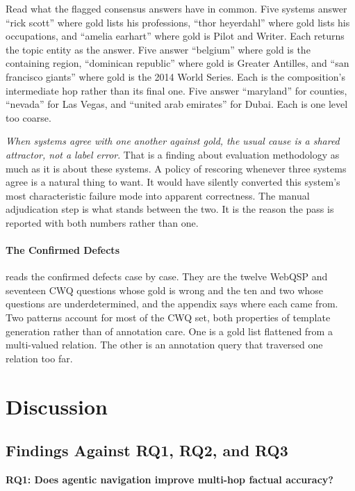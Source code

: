 Read what the flagged consensus answers have in common. Five systems answer
``rick scott'' where gold lists his professions, ``thor heyerdahl'' where gold
lists his occupations, and ``amelia earhart'' where gold is Pilot and Writer.
Each returns the topic entity as the answer. Five answer ``belgium'' where gold
is the containing region, ``dominican republic'' where gold is Greater Antilles,
and ``san francisco giants'' where gold is the 2014 World Series. Each is the
composition's intermediate hop rather than its final one. Five answer
``maryland'' for counties, ``nevada'' for Las Vegas, and ``united arab
emirates'' for Dubai. Each is one level too coarse.

\emph{When systems agree with one another against gold, the usual cause is a
shared attractor, not a label error}. That is a finding about evaluation
methodology as much as it is about these systems. A policy of rescoring whenever
three systems agree is a natural thing to want. It would have silently converted
this system's most characteristic failure mode into apparent correctness. The
manual adjudication step is what stands between the two. It is the reason the
pass is reported with both numbers rather than one.

\paragraph{The Confirmed Defects}

 reads the confirmed defects case by case. They are the twelve
WebQSP and seventeen CWQ questions whose gold is wrong and the ten and two whose
questions are underdetermined, and the appendix says where each came from. Two
patterns account for most of the CWQ set, both properties of template generation
rather than of annotation care. One is a gold list flattened from a multi-valued
relation. The other is an annotation query that traversed one relation too far.

\section{Discussion}\label{sec:discussion}

\subsection{Findings Against RQ1, RQ2, and RQ3}\label{sec:findings}

\textbf{RQ1: Does agentic navigation improve multi-hop factual accuracy?}

